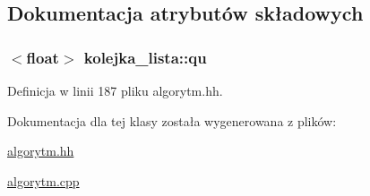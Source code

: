 \subsection{\-Dokumentacja atrybutów składowych}
\hypertarget{classkolejka__lista_a5e378458ccfc86d903b1a71a8ff5bad8}{
\subsubsection[{qu}]{$<$float$>$ {\bf kolejka\-\_\-lista\-::qu}}}\label{classkolejka__lista_a5e378458ccfc86d903b1a71a8ff5bad8}


\-Definicja w linii 187 pliku algorytm.\-hh.



\-Dokumentacja dla tej klasy została wygenerowana z plików\-:\begin{DoxyCompactItemize}
\item 
\hyperlink{algorytm_8hh}{algorytm.\-hh}\item 
\hyperlink{algorytm_8cpp}{algorytm.\-cpp}\end{DoxyCompactItemize}
